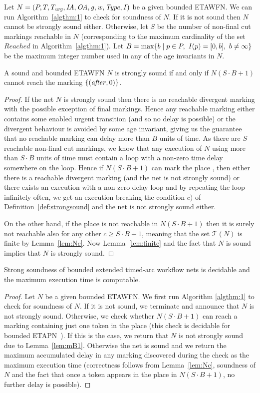 Let $N = (P, T, T_{\mathit{urg}}, \mathit{IA},\allowbreak \mathit{OA}, \mathit{g}, \mathit{w}, \mathit{Type}, \mathit{I})$ be a given bounded ETAWFN.
We can run Algorithm~\ref{algthm:1} to check for soundness of $N$.
If it is not sound then $N$ cannot be strongly sound either.
Otherwise, let $S$ be the number of non-final cut markings reachable in $N$
(corresponding to the maximum cardinality of the set $\mathit{Reached}$
in Algorithm~\ref{algthm:1}). 
Let $B=\max\{ b \mid p \in P,\ \mathit{I}(p)=[0,b],\ b \not=\infty\}$
be the maximum integer number used in any of the age invariants in $N$.

\begin{lemma} \label{lem:mB1}
A sound and bounded ETAWFN  $N$ is strongly sound if and only if
$N(S\cdot B+1)$ cannot reach the marking $\{({\mathit{after}},0)\}$. 
\end{lemma}
\begin{proof}
If the net $N$ is strongly sound then there is no
reachable divergent marking with the possible exception of final markings.
Hence any reachable marking either contains
some enabled urgent transition (and so no delay is possible) or
the divergent behaviour is avoided by some age invariant, giving us
the guarantee that no reachable marking can delay more than $B$
units of time. As there are $S$ reachable non-final cut markings,
we know that any execution of $N$ using more than $S\cdot B$ units of time
must contain a loop with a non-zero time delay somewhere on the loop.
Hence if $N(S\cdot B+1)$ can mark the place , then either there
is a reachable divergent marking (and the net is not strongly sound) or
there exists an execution with a non-zero delay loop and by repeating
the loop infinitely often, we get an execution breaking the condition $c)$
of Definition~\ref{def:strongsound} and the net is not strongly sound either.

On the other hand, if
the place  is not reachable in $N(S\cdot B+1)$ then it is surely
not reachable also for any other $c \geq S\cdot B+1$, meaning that
the set $\mathcal{T}(N)$ is finite by Lemma~\ref{lem:Nc}. Now
Lemma~\ref{lem:finite} and the fact that $N$ is sound
implies that $N$ is strongly sound.
\end{proof}


\begin{theorem} \label{thm:strong-max}
Strong soundness of bounded extended timed-arc workflow nets
is decidable and the maximum execution time is computable.
\end{theorem}
\begin{proof}
Let $N$ be a given bounded ETAWFN.
We first run Algorithm \ref{algthm:1} to check for soundness of $N$.
If it is not sound, we terminate and announce that $N$ is not strongly sound.
Otherwise,
we check whether $N(S\cdot B+1)$ can reach a marking containing just one token
in the place  (this check is decidable for
bounded ETAPN~\cite{ALSST:MEMICS:12}). If this is the case, we
return that $N$ is not strongly sound due to Lemma~\ref{lem:mB1}.
Otherwise the net is sound and we return the maximum accumulated delay
in any marking discovered during the check as the maximum execution
time (correctness follows from Lemma~\ref{lem:Nc},
soundness of $N$ and the fact that once a token appears
in the place  in $N(S\cdot B+1)$, no further delay is possible).
\end{proof}
